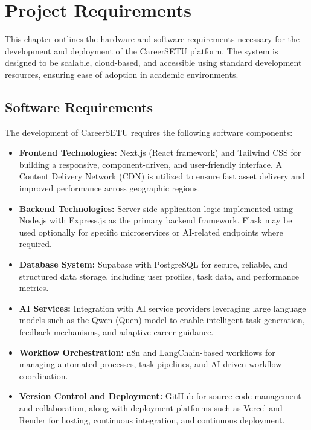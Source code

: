 \documentclass[12pt,a4paper]{report}
\begin{document}
\chapter{Project Requirements}

This chapter outlines the hardware and software requirements necessary for the
development and deployment of the CareerSETU platform. The system is designed to be
scalable, cloud-based, and accessible using standard development resources, ensuring
ease of adoption in academic environments.

\section{Software Requirements}

The development of CareerSETU requires the following software components:

\begin{itemize}
    \item \textbf{Frontend Technologies:} Next.js (React framework) and Tailwind CSS
    for building a responsive, component-driven, and user-friendly interface.
    A Content Delivery Network (CDN) is utilized to ensure fast asset delivery and
    improved performance across geographic regions.
    
    \item \textbf{Backend Technologies:} Server-side application logic implemented
    using Node.js with Express.js as the primary backend framework. Flask may be used
    optionally for specific microservices or AI-related endpoints where required.
    
    \item \textbf{Database System:} Supabase with PostgreSQL for secure, reliable, and
    structured data storage, including user profiles, task data, and performance metrics.
    
    \item \textbf{AI Services:} Integration with AI service providers leveraging
    large language models such as the Qwen (Quen) model to enable intelligent task
    generation, feedback mechanisms, and adaptive career guidance.
    
    \item \textbf{Workflow Orchestration:} n8n and LangChain-based workflows for managing
    automated processes, task pipelines, and AI-driven workflow coordination.
    
    \item \textbf{Version Control and Deployment:} GitHub for source code management
    and collaboration, along with deployment platforms such as Vercel and Render
    for hosting, continuous integration, and continuous deployment.
\end{itemize}
\end{document}
